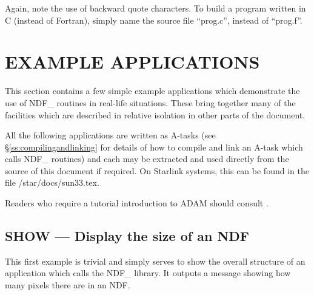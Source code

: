 \documentclass[twoside,11pt,nolof]{starlink}
\begin{document}
Again, note the use of backward quote characters. To build a program
written in C (instead of Fortran), simply name the source file
``prog.c'', instead of ``prog.f''.

\newpage
\appendix
\section{\label{ss:exampleapplications}EXAMPLE APPLICATIONS}

This section contains a few simple example applications which demonstrate the
use of NDF\_ routines in real-life situations. These bring together many of the
facilities which are described in relative isolation in other parts of the
document.

All the following applications are written as 
A-tasks (see \S\ref{ss:compilingandlinking} for details of how to
compile and link an A-task which calls NDF\_ routines) and each may be
extracted and used directly from the source of this document if
required. On Starlink systems, this can be found in the file
/star/docs/sun33.tex.

Readers who require a tutorial introduction to ADAM should consult
.

\subsection{SHOW --- Display the size of an NDF}

This first example is trivial and simply serves to show the overall
structure of an  application which calls the NDF\_
library. It
outputs a message showing how many pixels there are in an NDF.
\end{document}
